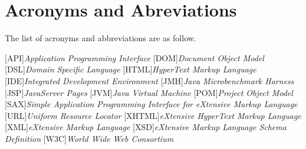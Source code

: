 \chapter*{Acronyms and Abreviations} \label{chap:acronyms}

The list of acronyms and abbreviations are as follow. \\

\begin{acronym}[Z] 

[API]{\emph{Application Programming Interface}}
[DOM]{\emph{Document Object Model}}
[DSL]{\emph{Domain Specific Language}}
[HTML]{\emph{HyperText Markup Language}}
[IDE]{\emph{Integrated Development Environment}}
[JMH]{\emph{Java Microbenchmark Harness}}
[JSP]{\emph{JavaServer Pages}}
[JVM]{\emph{Java Virtual Machine}}
[POM]{\emph{Project Object Model}}
[SAX]{\emph{Simple Application Programming Interface for eXtensive Markup Language}}
[URL]{\emph{Uniform Resource Locator}}
[XHTML]{\emph{eXtensive HyperText Markup Language}}
[XML]{\emph{eXtensive Markup Language}}
[XSD]{\emph{eXtensive Markup Language Schema Definition}}
[W3C]{\emph{World Wide Web Consortium}}

\end{acronym}


